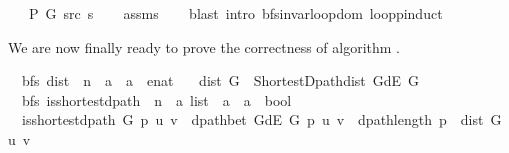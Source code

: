 \begin{isabellebody}
\ \ \ {\isachardoublequoteopen}P\ G\ src\ s{\isachardoublequoteclose}%
\endisataginvisible
{\isafoldinvisible}%
%
\isadeliminvisible
\isanewline
%
\endisadeliminvisible
%
\isadelimproof
\ \ %
\endisadelimproof
%
\isatagproof
{}\isamarkupfalse%
\ assms\isanewline
\ \ \isamarkupfalse%
\ {\isacharparenleft}{\kern0pt}blast\ intro{\isacharcolon}{\kern0pt}\ bfs{\isacharunderscore}{\kern0pt}invar{\isachardot}{\kern0pt}loop{\isacharunderscore}{\kern0pt}dom\ loop{\isachardot}{\kern0pt}pinduct{\isacharparenright}{\kern0pt}%
\endisatagproof
{\isafoldproof}%
%
\isadelimproof
%
\endisadelimproof
%
\isadelimdocument
%
\endisadelimdocument
%
\isatagdocument
%
\isamarkuptrue%
%
\endisatagdocument
{\isafolddocument}%
%
\isadelimdocument
%
\endisadelimdocument
%
\begin{isamarkuptext}%
We are now finally ready to prove the correctness of algorithm .%
\end{isamarkuptext}\isamarkuptrue%
\isamarkupfalse%
\ {\isacharparenleft}{\kern0pt}\ bfs{\isacharparenright}{\kern0pt}\ dist\ {\isacharcolon}{\kern0pt}{\isacharcolon}{\kern0pt}\ {\isachardoublequoteopen}{\isacharprime}{\kern0pt}n\ {\isasymRightarrow}\ {\isacharprime}{\kern0pt}a\ {\isasymRightarrow}\ {\isacharprime}{\kern0pt}a\ {\isasymRightarrow}\ enat{\isachardoublequoteclose}\ \isanewline
\ \ {\isachardoublequoteopen}dist\ G\ {\isasymequiv}\ Shortest{\isacharunderscore}{\kern0pt}Dpath{\isachardot}{\kern0pt}dist\ {\isacharparenleft}{\kern0pt}G{\isachardot}{\kern0pt}dE\ G{\isacharparenright}{\kern0pt}{\isachardoublequoteclose}\isanewline
\isanewline
{}\isamarkupfalse%
\ {\isacharparenleft}{\kern0pt}\ bfs{\isacharparenright}{\kern0pt}\ is{\isacharunderscore}{\kern0pt}shortest{\isacharunderscore}{\kern0pt}dpath\ {\isacharcolon}{\kern0pt}{\isacharcolon}{\kern0pt}\ {\isachardoublequoteopen}{\isacharprime}{\kern0pt}n\ {\isasymRightarrow}\ {\isacharprime}{\kern0pt}a\ list\ {\isasymRightarrow}\ {\isacharprime}{\kern0pt}a\ {\isasymRightarrow}\ {\isacharprime}{\kern0pt}a\ {\isasymRightarrow}\ bool{\isachardoublequoteclose}\ \isanewline
\ \ {\isachardoublequoteopen}is{\isacharunderscore}{\kern0pt}shortest{\isacharunderscore}{\kern0pt}dpath\ G\ p\ u\ v\ {\isasymequiv}\ dpath{\isacharunderscore}{\kern0pt}bet\ {\isacharparenleft}{\kern0pt}G{\isachardot}{\kern0pt}dE\ G{\isacharparenright}{\kern0pt}\ p\ u\ v\ {\isasymand}\ dpath{\isacharunderscore}{\kern0pt}length\ p\ {\isacharequal}{\kern0pt}\ dist\ G\ u\ v{\isachardoublequoteclose}\isanewline

\end{isabellebody}
